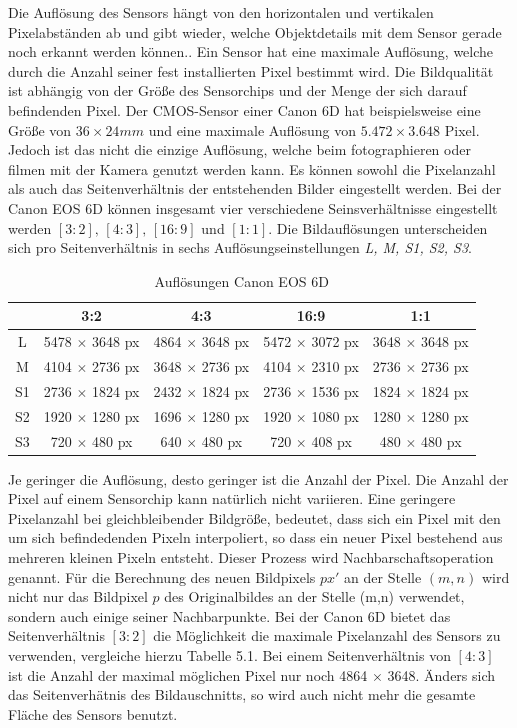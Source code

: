 Die Auflösung des Sensors hängt von den horizontalen und vertikalen Pixelabständen ab und gibt wieder, welche Objektdetails mit dem Sensor gerade noch erkannt werden können.\cite{Photonik}. Ein Sensor hat eine maximale Auflösung, welche durch die Anzahl seiner fest installierten Pixel bestimmt wird. Die Bildqualität ist abhängig von der Größe des Sensorchips und der Menge der sich darauf befindenden Pixel. Der CMOS-Sensor einer Canon 6D hat beispielsweise eine Größe von $36 \times 24 mm$ und eine maximale Auflösung von $5.472 \times 3.648$ Pixel. Jedoch ist das nicht die einzige Auflösung, welche beim fotographieren oder filmen mit der Kamera genutzt werden kann. Es können sowohl die Pixelanzahl als auch das Seitenverhältnis der entstehenden Bilder eingestellt werden. Bei der Canon EOS 6D können insgesamt vier verschiedene Seinsverhältnisse eingestellt werden $[3:2], \,[4:3], \,[16:9]$ und $[1:1]$\cite{Canon6D}. Die Bildauflösungen unterscheiden sich pro Seitenverhältnis in sechs Auflösungseinstellungen \textit{L, M, S1, S2, S3}. 

	\begin{table}[h]
	\centering
	\caption{Auflösungen Canon EOS 6D}
	\label{my-label}
	\begin{tabular}{c|c|c|c|c}
		\hline
		\rowcolor{blue!25} 	& 3:2 & 4:3 & 16:9 & 1:1 \\\hline		
		L	&  5478 $\times$ 3648 px & 4864 $\times$ 3648 px & 5472 $\times$ 3072 px & 3648 $\times$ 3648 px \\\hline		
		M &  4104 $\times$ 2736 px & 3648 $\times$ 2736 px & 4104 $\times$ 2310 px & 2736 $\times$ 2736 px \\\hline
		S1 &  2736 $\times$ 1824 px & 2432 $\times$ 1824 px & 2736 $\times$ 1536 px & 1824 $\times$ 1824 px \\\hline
		S2&  1920 $\times$ 1280 px & 1696 $\times$ 1280 px & 1920 $\times$ 1080 px & 1280 $\times$ 1280 px \\\hline
		S3&  720 $\times$ 480 px & 640 $\times$ 480 px & 720 $\times$ 408 px & 480 $\times$ 480 px \\\hline
	\end{tabular}
\end{table}

Je geringer die Auflösung, desto geringer ist die Anzahl der Pixel. Die Anzahl der Pixel auf einem Sensorchip kann natürlich nicht variieren. Eine geringere Pixelanzahl bei gleichbleibender Bildgröße, bedeutet, dass sich ein Pixel mit den um sich befindedenden Pixeln interpoliert, so dass ein neuer Pixel bestehend aus mehreren kleinen Pixeln entsteht. Dieser Prozess wird Nachbarschaftsoperation genannt. Für die Berechnung des neuen Bildpixels $px'$ an der Stelle $(m,n)$ wird nicht nur das Bildpixel $p$ des Originalbildes an der Stelle (m,n) verwendet, sondern auch einige seiner Nachbarpunkte\cite{Photonik}. Bei der Canon 6D bietet das Seitenverhältnis $[3:2]$ die Möglichkeit die maximale Pixelanzahl des Sensors zu verwenden, vergleiche hierzu Tabelle 5.1. Bei einem Seitenverhältnis von $[4:3]$ ist die Anzahl der maximal möglichen Pixel nur noch 4864 $\times$ 3648. Änders sich das Seitenverhätnis des Bildauschnitts, so wird auch nicht mehr die gesamte Fläche des Sensors benutzt. 

